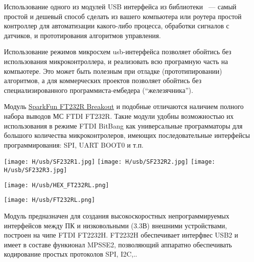 \secdown

Использование одного из модулей USB интерфейса из библиотеки \odurino\ --- самый
простой и дешевый способ сделать из вашего компьютера или роутера простой
контроллер для автоматизации какого-либо процесса, обработки сигналов с
датчиков, и прототирования алгоритмов управления.

Использование  режимов микросхем usb-интерфейса
позволяет обойтись без использования микроконтроллера, и реализовать всю
програмную часть на компьютере. Это может быть полезным при отладке
(прототипировании) алгоритмов, а для коммерческих проектов позволяет обойтись
без специализированного программиста-ембедера (``железячника'').

\label{HEXFT232RL}

Модуль \href{https://www.sparkfun.com/products/retired/718}{SparkFun FT232R
Breakout} и подобные отличаются наличием полного набора выводов МС FTDI FT232R.
Такие модули удобны возможностью их использования в режиме FTDI BitBang как
универсальные программаторы для большого количества микроконтролеров, имеющих
последовательные интерфейсы программирования: SPI, UART BOOT0 и т.п.

\texttt{[image: H/usb/SF232R1.jpg]}
\texttt{[image: H/usb/SF232R2.jpg]}
\texttt{[image: H/usb/SF232R3.jpg]}

\texttt{[image: H/usb/HEX\_FT232RL.png]}

\label{FT232RL}

\texttt{[image: H/usb/FT232RL.png]}

\label{FT2232H}

Модуль предназначен для создания высокоскоростных непрограммируемых интерфейсов
между ПК и низковольными (3.3В) внешними устройствами, построен на чипе FTDI
FT2232H. FT2232H обеспечивает интерфвес USB2 и имеет в составе функионал
MPSSE2, позволяющий аппаратно обеспечивать кодирование простых протоколов SPI,
I2C,..

\label{USBJTAG}

\secup
